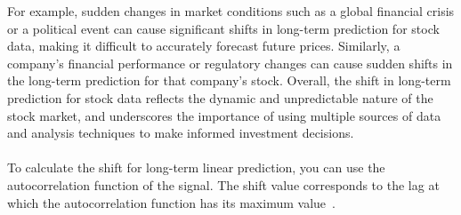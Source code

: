     For example, sudden changes in market conditions such as a global financial crisis or a political event can cause significant shifts in long-term
    prediction for stock data, making it difficult to accurately forecast future prices. Similarly, a company's financial performance or regulatory
    changes can cause sudden shifts in the long-term prediction for that company's stock.
    Overall, the shift in long-term prediction for stock data reflects the dynamic and unpredictable nature of the stock market,
    and underscores the importance of using multiple sources of data and analysis techniques to make informed investment decisions.\\
    \\
    To calculate the shift for long-term linear prediction, you can use the autocorrelation function of the signal.
    The shift value corresponds to the lag at which the autocorrelation function has its maximum value~\cite{mills2015time}.
